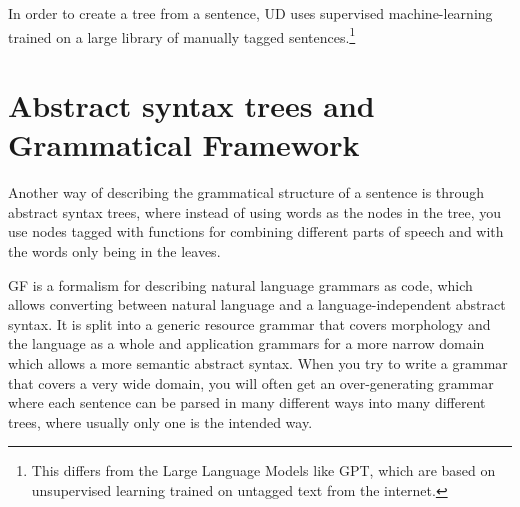 In order to create a tree from a sentence, UD uses supervised machine-learning trained on a large library of manually tagged sentences.\footnote{This differs from the Large Language Models like GPT, which are based on unsupervised learning trained on untagged text from the internet.}










\section{Abstract syntax trees and Grammatical Framework}

Another way of describing the grammatical structure of a sentence is through abstract syntax trees, where instead of using words as the nodes in the tree, you use nodes tagged with functions for combining different parts of speech and with the words only being in the leaves. 


\ac{GF}\cite{ranta-2004} is a formalism for describing natural language grammars as code, which allows converting between natural language and a language-independent abstract syntax. It is split into a generic resource grammar that covers morphology and the language as a whole and application grammars for a more narrow domain which allows a more semantic abstract syntax. When you try to write a grammar that covers a very wide domain, you will often get an over-generating grammar where each sentence can be parsed in many different ways into many different trees, where usually only one is the intended way.

